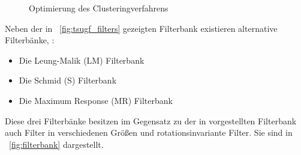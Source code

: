 \begin{figure}[h!]
\begin{subfigure}[t]{0.32\textwidth}
	\end{subfigure}
	\hfill
	\begin{subfigure}[t]{0.32\textwidth}
		\hfill
	\end{subfigure}
	\caption{Optimierung des Clusteringverfahrens}
	\label{fig:tsugf_optim}
\end{figure}

Neben der in \figurename~\ref{fig:tsugf_filters} gezeigten Filterbank existieren alternative Filterbänke, \ua:
\begin{itemize}
	\item Die Leung-Malik (LM) Filterbank \cite{leung_01}
	\item Die Schmid (S) Filterbank \cite{schmid_01}
	\item Die Maximum Response (MR) Filterbank \cite{visgeo}
\end{itemize}

Diese drei Filterbänke besitzen im Gegensatz zu der in \cite{mathworks_15} vorgestellten Filterbank auch Filter in verschiedenen Größen und rotationsinvariante Filter. Sie sind in \figurename~\ref{fig:filterbank} dargestellt.

